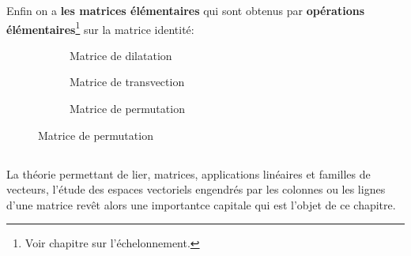 Enfin on a \textbf{les matrices élémentaires} qui sont obtenus par \textbf{opérations élémentaires}\footnote[1]{Voir chapitre sur l'échelonnement.} sur la matrice identité:
\begin{figure}[h]
   \color{DarkBlue1}
   \centering
   \begin{subfigure}{.3\textwidth}
      \centering
      \caption*{\color{DarkBlue1}Matrice de dilatation}
   \end{subfigure}\quad
   \begin{subfigure}{.3\textwidth}
      \centering
      \caption*{\color{DarkBlue1}Matrice de transvection}
   \end{subfigure}\quad
   \begin{subfigure}{.3\textwidth}
      \centering
      \caption*{\color{DarkBlue1}Matrice de permutation}
   \end{subfigure}
\end{figure}

\subsection*{}
La théorie permettant de lier, matrices, applications linéaires et familles de vecteurs, l'étude des espaces vectoriels engendrés par les colonnes ou les lignes d'une matrice revêt alors une importantce capitale qui est l'objet de ce chapitre.\<

